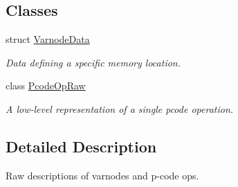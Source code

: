 \subsection*{Classes}
\begin{DoxyCompactItemize}
\item 
struct \mbox{\hyperlink{struct_varnode_data}{Varnode\+Data}}
\begin{DoxyCompactList}\small\item\em Data defining a specific memory location. \end{DoxyCompactList}\item 
class \mbox{\hyperlink{class_pcode_op_raw}{Pcode\+Op\+Raw}}
\begin{DoxyCompactList}\small\item\em A low-\/level representation of a single pcode operation. \end{DoxyCompactList}\end{DoxyCompactItemize}


\subsection{Detailed Description}
Raw descriptions of varnodes and p-\/code ops. 

